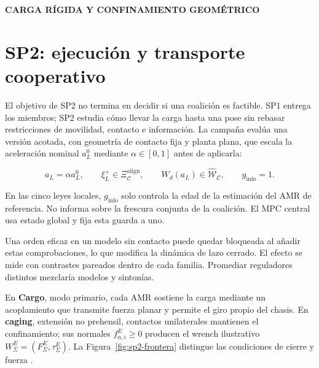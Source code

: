 \documentclass[12pt,a4paper]{article}
\newcommand{\leveltag}[1]{%
  \Needspace{5.5\baselineskip}%
  \noindent\colorbox{VIUDark}{%
    \parbox{\dimexpr\textwidth-2\fboxsep\relax}{%
      \color{white}\sffamily\bfseries\small #1%
    }%
  }\par\smallskip
}
\begin{document}
\viuromanfoliofalse
{}
\setcounter{page}{1}
\setlength{\parskip}{1.5pt plus .5pt}
\setlength{\abovedisplayskip}{5pt plus 1pt minus 1pt}
\setlength{\belowdisplayskip}{5pt plus 1pt minus 1pt}
\setlength{\abovedisplayshortskip}{3pt plus 1pt}
\setlength{\belowdisplayshortskip}{3pt plus 1pt}
\setlength{\textfloatsep}{8pt plus 2pt minus 2pt}
\setlength{\intextsep}{8pt plus 2pt minus 2pt}

\leveltag{CARGA RÍGIDA Y CONFINAMIENTO GEOMÉTRICO}
\section*{SP2: ejecución y transporte cooperativo}

El objetivo de SP2 no termina en decidir si una coalición es factible. SP1
entrega los miembros; SP2 estudia cómo llevar la carga hasta una pose sin
rebasar restricciones de movilidad, contacto e información. La campaña evalúa
una versión acotada, con geometría de contacto fija y planta plana, que escala
la aceleración nominal $a_L^0$ mediante $\alpha\in[0,1]$ antes de aplicarla:

\[
 a_L=\alpha a_L^0,\qquad
 \xi_L^+\in\Xi_{\mathcal C}^{\mathrm{align}},\qquad
 W_d(a_L)\in\widehat{\mathcal W}_{\mathcal C},\qquad
 g_{\mathrm{info}}=1 .
\]

En las cinco leyes locales, $g_{\mathrm{info}}$ solo controla la edad de la
estimación del AMR de referencia. No informa sobre la frescura conjunta de la
coalición. El MPC central usa estado global y fija esta guarda a uno.

Una orden eficaz en un modelo sin contacto puede quedar bloqueada al añadir
estas comprobaciones, lo que modifica la dinámica de lazo cerrado. El efecto se
mide con contrastes pareados dentro de cada familia. Promediar reguladores
distintos mezclaría modelos y sintonías.

En \textbf{Cargo}, modo primario, cada AMR sostiene la carga mediante un
acoplamiento que transmite fuerza planar y permite el giro propio del chasis.
En \textbf{caging}, extensión no prehensil, contactos unilaterales mantienen el
confinamiento; sus normales $f_{n,i}^{E}\geq0$ producen el wrench ilustrativo
$W_\Sigma^{E}=(F_\Sigma^{E},\tau_\Sigma^{E})$. La
Figura~\ref{fig:sp2-frontera} distingue las condiciones de cierre y fuerza
\parencite{bicchi1995closure,pereira2004caging}.
\end{document}

